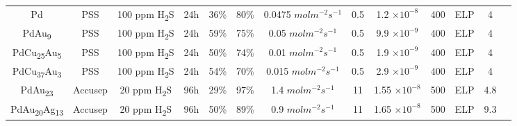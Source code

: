 \begin{longtable}{@{\extracolsep{\fill}}ccccccccccccc@{}}
    Pd                      &      PSS         &  100 ppm H\textsubscript{2}S     & 24h          & 36\%               & 80\%  & 0.0475 $mol m^{-2} s^{-1}$       & 0.5                             & 1.2 $\times10^{-8}$        & 400                                    & ELP                  & 4                                                                             & \cite{TD2014}                  \\

    PdAu\textsubscript{9}                      &      PSS         &  100 ppm H\textsubscript{2}S     & 24h          & 59\%               & 75\%  & 0.05 $mol m^{-2} s^{-1}$       & 0.5                             & 9.9 $\times10^{-9}$        & 400                                    & ELP                  & 4                                                                             & \cite{TD2014}                  \\

    PdCu\textsubscript{25}Au\textsubscript{5}                      &      PSS         &  100 ppm H\textsubscript{2}S     & 24h          & 50\%               & 74\%  & 0.01 $mol m^{-2} s^{-1}$       & 0.5                             & 1.9 $\times10^{-9}$        & 400                                    & ELP                  & 4                                                                             & \cite{TD2014}                  \\

    PdCu\textsubscript{37}Au\textsubscript{3}                      &      PSS         &  100 ppm H\textsubscript{2}S     & 24h          & 54\%               & 70\%  & 0.015 $mol m^{-2} s^{-1}$       & 0.5                             & 2.9 $\times10^{-9}$        & 400                                    & ELP                  & 4                                                                             & \cite{TD2014}                  \\

    PdAu\textsubscript{23}                      &      Accusep         &  20 ppm H\textsubscript{2}S     & 96h          & 29\%               & 97\%  & 1.4 $mol m^{-2} s^{-1}$       & 11                             & 1.55 $\times10^{-8}$        & 500                                    & ELP                  & 4.8                                                                             & \cite{Lewis2014}                  \\

    PdAu\textsubscript{20}Ag\textsubscript{13}                      &      Accusep         &  20 ppm H\textsubscript{2}S     & 96h          & 50\%               & 89\%  & 0.9 $mol m^{-2} s^{-1}$       & 11                             & 1.65 $\times10^{-8}$        & 500                                    & ELP                  & 9.3                                                                             & \cite{Lewis2014}                  \\

    \bottomrule 
    \end{longtable}

